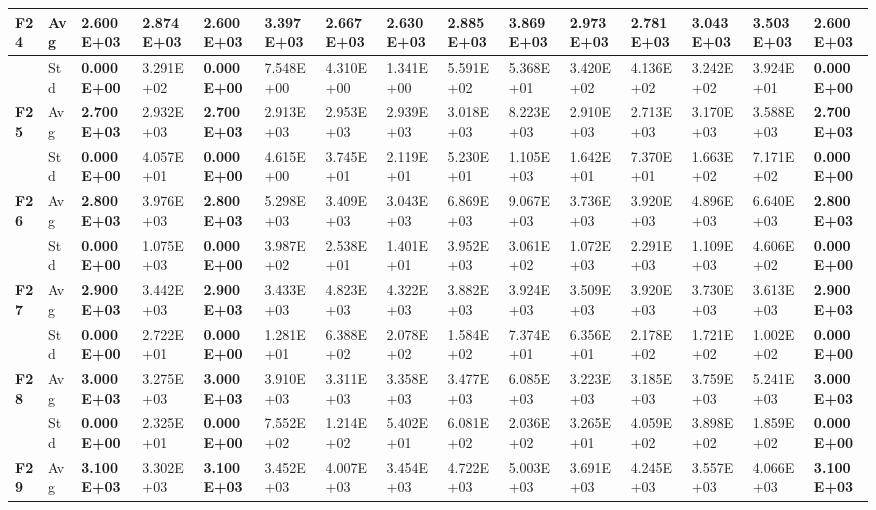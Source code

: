 \documentclass{article} %
\begin{document}
\begin{tabular}{|p{0.2in}|p{0.2in}|p{0.4in}|p{0.4in}|p{0.4in}|p{0.4in}|p{0.4in}|p{0.4in}|p{0.4in}|p{0.4in}|p{0.4in}|p{0.4in}|p{0.4in}|p{0.4in}|p{0.4in}|}
\textbf{F24} & Avg & \textbf{2.600E+03} & 2.874E+03 & \textbf{2.600E+03} & 3.397E+03 & 2.667E+03 & 2.630E+03 & 2.885E+03 & 3.869E+03 & 2.973E+03 & 2.781E+03 & 3.043E+03 & 3.503E+03 & \textbf{2.600E+03} \\ \hline 
\textbf{} & Std & \textbf{0.000E+00} & 3.291E+02 & \textbf{0.000E+00} & 7.548E+00 & 4.310E+00 & 1.341E+00 & 5.591E+02 & 5.368E+01 & 3.420E+02 & 4.136E+02 & 3.242E+02 & 3.924E+01 & \textbf{0.000E+00} \\ \hline 
\textbf{F25} & Avg & \textbf{2.700E+03} & 2.932E+03 & \textbf{2.700E+03} & 2.913E+03 & 2.953E+03 & 2.939E+03 & 3.018E+03 & 8.223E+03 & 2.910E+03 & 2.713E+03 & 3.170E+03 & 3.588E+03 & \textbf{2.700E+03} \\ \hline 
\textbf{} & Std & \textbf{0.000E+00} & 4.057E+01 & \textbf{0.000E+00} & 4.615E+00 & 3.745E+01 & 2.119E+01 & 5.230E+01 & 1.105E+03 & 1.642E+01 & 7.370E+01 & 1.663E+02 & 7.171E+02 & \textbf{0.000E+00} \\ \hline 
\textbf{F26} & Avg & \textbf{2.800E+03} & 3.976E+03 & \textbf{2.800E+03} & 5.298E+03 & 3.409E+03 & 3.043E+03 & 6.869E+03 & 9.067E+03 & 3.736E+03 & 3.920E+03 & 4.896E+03 & 6.640E+03 & \textbf{2.800E+03} \\ \hline 
\textbf{} & Std & \textbf{0.000E+00} & 1.075E+03 & \textbf{0.000E+00} & 3.987E+02 & 2.538E+01 & 1.401E+01 & 3.952E+03 & 3.061E+02 & 1.072E+03 & 2.291E+03 & 1.109E+03 & 4.606E+02 & \textbf{0.000E+00} \\ \hline 
\textbf{F27} & Avg & \textbf{2.900E+03} & 3.442E+03 & \textbf{2.900E+03} & 3.433E+03 & 4.823E+03 & 4.322E+03 & 3.882E+03 & 3.924E+03 & 3.509E+03 & 3.920E+03 & 3.730E+03 & 3.613E+03 & \textbf{2.900E+03} \\ \hline 
\textbf{} & Std & \textbf{0.000E+00} & 2.722E+01 & \textbf{0.000E+00} & 1.281E+01 & 6.388E+02 & 2.078E+02 & 1.584E+02 & 7.374E+01 & 6.356E+01 & 2.178E+02 & 1.721E+02 & 1.002E+02 & \textbf{0.000E+00} \\ \hline 
\textbf{F28} & Avg & \textbf{3.000E+03} & 3.275E+03 & \textbf{3.000E+03} & 3.910E+03 & 3.311E+03 & 3.358E+03 & 3.477E+03 & 6.085E+03 & 3.223E+03 & 3.185E+03 & 3.759E+03 & 5.241E+03 & \textbf{3.000E+03} \\ \hline 
\textbf{} & Std & \textbf{0.000E+00} & 2.325E+01 & \textbf{0.000E+00} & 7.552E+02 & 1.214E+02 & 5.402E+01 & 6.081E+02 & 2.036E+02 & 3.265E+01 & 4.059E+02 & 3.898E+02 & 1.859E+02 & \textbf{0.000E+00} \\ \hline 
\textbf{F29} & Avg & \textbf{3.100E+03} & 3.302E+03 & \textbf{3.100E+03} & 3.452E+03 & 4.007E+03 & 3.454E+03 & 4.722E+03 & 5.003E+03 & 3.691E+03 & 4.245E+03 & 3.557E+03 & 4.066E+03 & \textbf{3.100E+03} \\ \hline 

\end{tabular}
\end{document}

